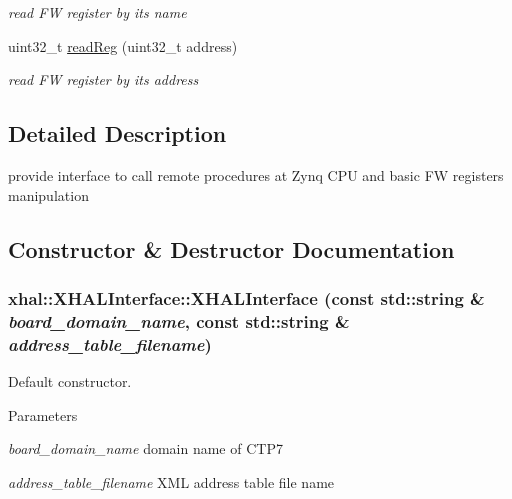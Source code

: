 \begin{DoxyCompactItemize}
\begin{DoxyCompactList}\small\item\em read FW register by its name \item\end{DoxyCompactList}\item 
\hypertarget{classxhal_1_1XHALInterface_a1e3b29169f1bc6c13e469cd186fc662f}{
uint32\_\-t \hyperlink{classxhal_1_1XHALInterface_a1e3b29169f1bc6c13e469cd186fc662f}{readReg} (uint32\_\-t address)}
\label{classxhal_1_1XHALInterface_a1e3b29169f1bc6c13e469cd186fc662f}

\begin{DoxyCompactList}\small\item\em read FW register by its address \item\end{DoxyCompactList}\end{DoxyCompactItemize}


\subsection{Detailed Description}
provide interface to call remote procedures at Zynq CPU and basic FW registers manipulation 

\subsection{Constructor \& Destructor Documentation}
\hypertarget{classxhal_1_1XHALInterface_ac44129acadc38854d639e1dfa6fd6d92}{
\subsubsection[{XHALInterface}]{\setlength{\rightskip}{0pt plus 5cm}xhal::XHALInterface::XHALInterface (const std::string \& {\em board\_\-domain\_\-name}, \/  const std::string \& {\em address\_\-table\_\-filename})}}
\label{classxhal_1_1XHALInterface_ac44129acadc38854d639e1dfa6fd6d92}


Default constructor. 
\begin{DoxyParams}{Parameters}
\item[{\em board\_\-domain\_\-name}]domain name of CTP7 \item[{\em address\_\-table\_\-filename}]XML address table file name \end{DoxyParams}


